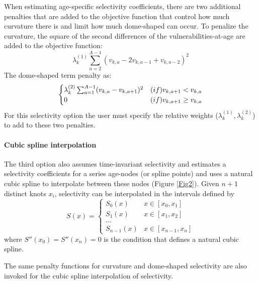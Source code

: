 When estimating age-specific selectivity coefficients, there are two additional penalties that are added to the objective function that control how much curvature there is and limit how much dome-shaped can occur.  To penalize the curvature, the square of the second differences of the vulnerabilities-at-age are added to the objective function: 
\[
\lambda_k^{(1)} \sum_{a=2}^{A-1}(v_{k,a} - 2v_{k,a-1} + v_{k,a-2})^2
\]
The dome-shaped term penalty as:
\[
\begin{cases}
\lambda_k^{(2)} \sum_{a=1}^{A-1}(v_{k,a} - v_{k,a+1})^2& \mbox(if) v_{k,a+1}< v_{k,a}\\
0 & \mbox(if) v_{k,a+1}\geq v_{k,a}
\end{cases}
\]
For this selectivity option the user must specify the relative weights ($\lambda_k^{(1)},\lambda_k^{(2)}$) to add to these two penalties.

\paragraph{Cubic spline interpolation}
The third option also assumes time-invariant selectivity and estimates a selectivity coefficients for a series age-nodes (or spline points) and uses a natural cubic spline to interpolate between these nodes (Figure \ref{Fig2}). Given $n+1$ distinct knots $x_i$, selectivity can be interpolated in the intervals defined by
\[
S(x) = \begin{cases}
    S_0(x) & x \in [x_0,x_1]\\
    S_1(x) & x \in [x_1,x_2]\\
    ...\\
    S_{n-1}(x) & x \in [x_{n-1},x_n]
\end{cases}
\]
where  $S''(x_0) = S''(x_n)=0$  is the condition that defines a natural cubic spline.

The same penalty functions for curvature and dome-shaped selectivity are also invoked for the cubic spline interpolation of selectivity.

